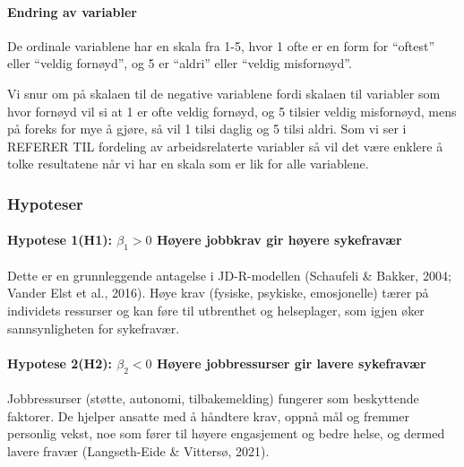 \documentclass[
  12pt,
  a4paper,
  DIV=11,
  numbers=noendperiod]{scrartcl}
\let\oldparagraph\paragraph
\renewcommand{\paragraph}[1]{\oldparagraph{#1}\mbox{}}
\begin{document}
\paragraph{Endring av variabler}\label{endring-av-variabler}

De ordinale variablene har en skala fra 1-5, hvor 1 ofte er en form for
``oftest'' eller ``veldig fornøyd'', og 5 er ``aldri'' eller ``veldig
misfornøyd''.

Vi snur om på skalaen til de negative variablene fordi skalaen til
variabler som hvor fornøyd vil si at 1 er ofte veldig fornøyd, og 5
tilsier veldig misfornøyd, mens på foreks for mye å gjøre, så vil 1
tilsi daglig og 5 tilsi aldri. Som vi ser i REFERER TIL fordeling av
arbeidsrelaterte variabler så vil det være enklere å tolke resultatene
når vi har en skala som er lik for alle variablene.

\subsubsection{Hypoteser}\label{sec-hypot}

\paragraph{\texorpdfstring{Hypotese 1(H1): \(\beta_1 > 0\) Høyere
jobbkrav gir høyere
sykefravær}{Hypotese 1(H1): \textbackslash beta\_1 \textgreater{} 0 Høyere jobbkrav gir høyere sykefravær}}\label{hypotese-1h1-beta_1-0-huxf8yere-jobbkrav-gir-huxf8yere-sykefravuxe6r}

Dette er en grunnleggende antagelse i JD-R-modellen (Schaufeli \&
Bakker, 2004; Vander Elst et al., 2016). Høye krav (fysiske, psykiske,
emosjonelle) tærer på individets ressurser og kan føre til utbrenthet og
helseplager, som igjen øker sannsynligheten for sykefravær.

\paragraph{\texorpdfstring{Hypotese 2(H2): \(\beta_2 < 0\) Høyere
jobbressurser gir lavere
sykefravær}{Hypotese 2(H2): \textbackslash beta\_2 \textless{} 0 Høyere jobbressurser gir lavere sykefravær}}\label{hypotese-2h2-beta_2-0-huxf8yere-jobbressurser-gir-lavere-sykefravuxe6r}

Jobbressurser (støtte, autonomi, tilbakemelding) fungerer som
beskyttende faktorer. De hjelper ansatte med å håndtere krav, oppnå mål
og fremmer personlig vekst, noe som fører til høyere engasjement og
bedre helse, og dermed lavere fravær (Langseth-Eide \& Vittersø, 2021).
\end{document}
